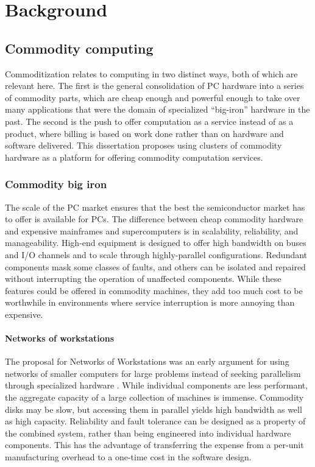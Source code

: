 \chapter{Background}\label{cha:background}

\section{Commodity computing}

Commoditization relates to computing in two distinct ways, both of which are relevant here. The first is the general consolidation of PC hardware into a series of commodity parts, which are cheap enough and powerful enough to take over many applications that were the domain of specialized ``big-iron'' hardware in the past. The second is the push to offer computation as a service instead of as a product, where billing is based on work done rather than on hardware and software delivered. This dissertation proposes using clusters of commodity hardware as a platform for offering commodity computation services.

\subsection{Commodity big iron}

The scale of the PC market ensures that the best the semiconductor market has to offer is available for PCs. The difference between cheap commodity hardware and expensive mainframes and supercomputers is in scalability, reliability, and manageability. High-end equipment is designed to offer high bandwidth on buses and I/O channels and to scale through highly-parallel configurations. Redundant components mask some classes of faults, and others can be isolated and repaired without interrupting the operation of unaffected components. While these features could be offered in commodity machines, they add too much cost to be worthwhile in environments where service interruption is more annoying than expensive.

\subsubsection{Networks of workstations}

The proposal for Networks of Workstations was an early argument for using networks of smaller computers for large problems instead of seeking parallelism through specialized hardware \cite{anderson95a}. While individual components are less performant, the aggregate capacity of a large collection of machines is immense. Commodity disks may be slow, but accessing them in parallel yields high bandwidth as well as high capacity. Reliability and fault tolerance can be designed as a property of the combined system, rather than being engineered into individual hardware components. This has the advantage of transferring the expense from a per-unit manufacturing overhead to a one-time cost in the software design.

